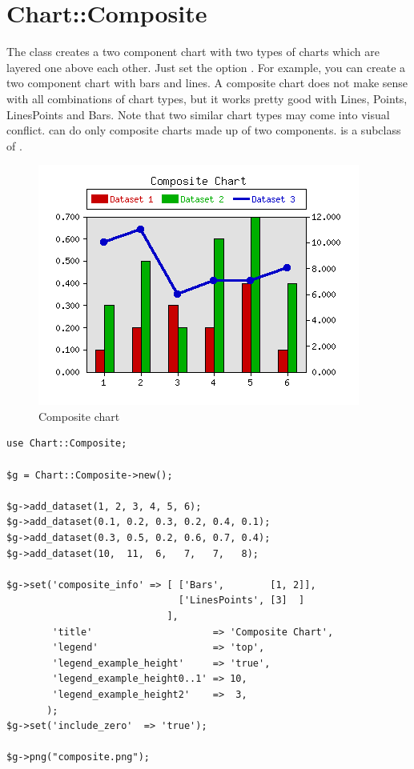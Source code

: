 %
\renewcommand{\thisname}{Chart::Composite}
\section{\thisname}
\name{\thisname}
\begin{Description}
The class \thisclass creates a two component chart with two types of
charts which are layered one above each other. Just set the option
. For example, you can create a two component
chart with bars and lines. A composite chart does not make sense with
all combinations of chart types, but it works pretty good with Lines,
Points, LinesPoints and Bars. Note that two similar chart types may come
into visual conflict. \thisclass can do only composite charts made up of
two components. \thisclass is a subclass of .
\end{Description}

\example
\begin{figure}[ht]
  \begin{center}
    \includegraphics[scale=0.6]{composite.png}
  \end{center}
  \caption{Composite chart}
  \label{fig:composite}
\end{figure}
\begin{verbatim}
use Chart::Composite;

$g = Chart::Composite->new();

$g->add_dataset(1, 2, 3, 4, 5, 6);
$g->add_dataset(0.1, 0.2, 0.3, 0.2, 0.4, 0.1);
$g->add_dataset(0.3, 0.5, 0.2, 0.6, 0.7, 0.4);
$g->add_dataset(10,  11,  6,   7,   7,   8);

$g->set('composite_info' => [ ['Bars',        [1, 2]],
                              ['LinesPoints', [3]  ]
                            ],
        'title'                     => 'Composite Chart',
        'legend'                    => 'top',
        'legend_example_height'     => 'true',
        'legend_example_height0..1' => 10,
        'legend_example_height2'    =>  3,
       );
$g->set('include_zero'  => 'true');

$g->png("composite.png");
\end{verbatim}

